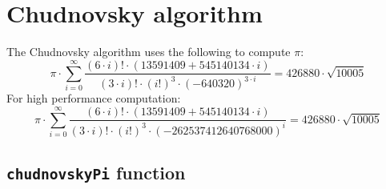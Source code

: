 
\section{Chudnovsky algorithm}

The Chudnovsky algorithm uses the following to compute $\pi$:
%
\begin{displaymath}
\pi \cdot \sum_{i=0}^{\infty} \frac{(6\cdot i)!\cdot(13591409 + 545140134 \cdot i)}{(3\cdot i)!\cdot(i!)^3\cdot (-640320)^{3\cdot i}}  = 426880 \cdot \sqrt{10005}
\end{displaymath}
%
For high performance computation:
%
\begin{displaymath}
\pi \cdot \sum_{i=0}^{\infty} \frac{(6\cdot i)!\cdot(13591409 + 545140134 \cdot i)}{(3\cdot i)!\cdot(i!)^3\cdot (-262537412640768000)^{i}}  = 426880 \cdot \sqrt{10005}
\end{displaymath}
%

\subsection{\texttt{chudnovskyPi} function}
